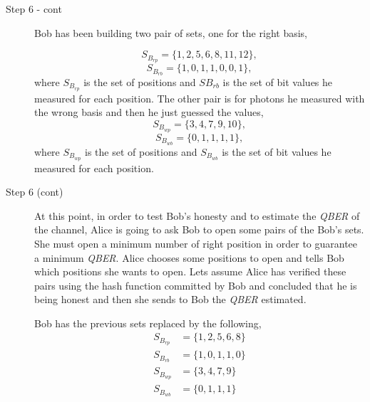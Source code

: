 
\large
\vspace*{0mm}
\begin{description}
  \item[Step 6 - cont] Bob has been building two pair of sets, one for the right basis,

      $$S_{B_{rp}}= \{1,2,5,6,8,11,12 \},$$ $$ S_{B_{rb}} = \{1,0,1,1,0,0,1 \},$$
      where $S_{B_{rp}}$ is the set of positions and $SB_{rb}$ is the set of bit values he measured for each position. The other pair is for photons he measured with the wrong basis and then he just guessed the values,
      $$S_{B_{wp}}= \{3,4,7,9,10 \},$$ $$S_{B_{wb}} = \{0,1,1,1,1 \},$$
      where $S_{B_{wp}}$ is the set of positions and $S_{B_{wb}}$ is the set of bit values he measured for each position.



\end{description}

\large
\vspace*{0mm}

 \begin{description}
   \item[Step 6 (cont)]   At this point, in order to test Bob's honesty and to estimate the \textit{QBER} of the channel, Alice is going to ask Bob to open some pairs of the Bob's sets. She must open a minimum number of right position in order to guarantee a minimum \textit{QBER}.
       Alice chooses some positions to open and tells Bob which positions she wants to open.
        Lets assume Alice has verified these pairs using the hash function committed by Bob and concluded that he is being honest and then she sends to Bob the \textit{QBER} estimated.

    Bob has the previous sets replaced by the following,
      \begin{align*}
        S_{B_{rp}} & = \{1,2,5,6,8 \} \\
        S_{B_{rb}} & = \{1,0,1,1,0 \} \\
        S_{B_{wp}} & = \{3,4,7,9 \} \\
        S_{B_{wb}} & = \{0,1,1,1 \}
      \end{align*}


 \end{description}

